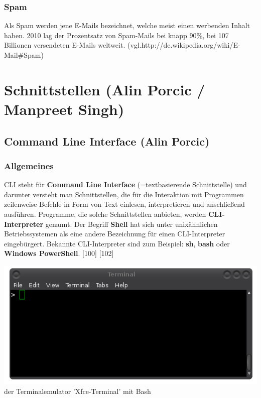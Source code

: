 \documentclass[12pt,a4paper]{report}
\begin{document}
\begin{onehalfspace}
\subsection{Spam}\label{sssec:Spam}
Als Spam werden jene E-Mails bezeichnet, welche meist einen werbenden Inhalt haben. 2010 lag der Prozentsatz von Spam-Mails bei knapp 90\%, bei 107 Billionen versendeten E-Mails weltweit.  (vgl.http://de.wikipedia.org/wiki/E-Mail\#Spam) 
\chapter{Schnittstellen (Alin Porcic / Manpreet Singh)}

\section{Command Line Interface (Alin Porcic)}
\subsection{Allgemeines}

CLI steht für \textbf{Command Line Interface} (=textbasierende Schnittstelle) und darunter versteht man Schnittstellen, die für die Interaktion mit Programmen zeilenweise Befehle in Form von Text einlesen, interpretieren und anschließend ausführen. Programme, die solche Schnittstellen anbieten, werden \textbf{CLI-Interpreter} genannt. Der Begriff \textbf{Shell} hat sich unter unixähnlichen Betriebssystemen als eine andere Bezeichnung für einen CLI-Interpreter eingebürgert. Bekannte CLI-Interpreter sind zum Beispiel: \textbf{sh}, \textbf{bash} oder \textbf{Windows PowerShell}. [100] [102]

\begin{center}
\includegraphics[scale=0.5]{img/cli_pic.png}\\
der Terminalemulator 'Xfce-Terminal' mit Bash
\end{center}


\end{onehalfspace}
\end{document}
